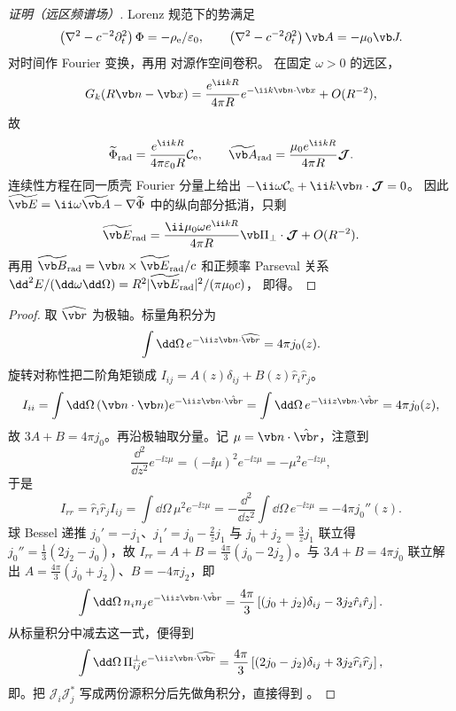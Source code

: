 \begin{proof}[证明（远区频谱场）]
Lorenz 规范下的势满足
\[
 \left(\nabla^2-c^{-2}\partial_t^2\right)\Phi=-\rho_{\rm e}/\varepsilon_0,
 \qquad
 \left(\nabla^2-c^{-2}\partial_t^2\right)\vb A=-\mu_0\vb J .
\]
对时间作 Fourier 变换，再用 对源作空间卷积。
在固定 \(\omega>0\) 的远区，
\[
 G_k(R\vb n-\vb x)
 =\frac{e^{\ii kR}}{4\pi R}e^{-\ii k\vb n\cdot\vb x}
 +O(R^{-2}),
\]
故
\[
 \widetilde\Phi_{\rm rad}
 =\frac{e^{\ii kR}}{4\pi\varepsilon_0R}\mathcal C_{\rm e},
 \qquad
 \widetilde{\vb A}_{\rm rad}
 =\frac{\mu_0e^{\ii kR}}{4\pi R}\boldsymbol{\mathcal J}.
\]
连续性方程在同一质壳 Fourier 分量上给出
\(-\ii\omega\mathcal C_{\rm e}+\ii k\vb n\cdot\boldsymbol{\mathcal J}=0\)。
因此 \(\widetilde{\vb E}=\ii\omega\widetilde{\vb A}-\nabla\widetilde\Phi\)
中的纵向部分抵消，只剩
\[
 \widetilde{\vb E}_{\rm rad}
 =\frac{\ii\mu_0\omega e^{\ii kR}}{4\pi R}
 \vb\Pi_\perp\cdot\boldsymbol{\mathcal J}+O(R^{-2}).
\]
再用 \(\widetilde{\vb B}_{\rm rad}=\vb n\times\widetilde{\vb E}_{\rm rad}/c\)
和正频率 Parseval 关系
\( \dd^2E/(\dd\omega\dd\Omega)=R^2|\widetilde{\vb E}_{\rm rad}|^2/(\pi\mu_0c)\)，
即得。
\end{proof}

\begin{proof}
取 \(\widehat{\vb r}\) 为极轴。标量角积分为
\[
 \int\dd\Omega\,e^{-\ii z\vb n\cdot\widehat{\vb r}}=4\pi j_0(z).
\]
旋转对称性把二阶角矩锁成 \(I_{ij}=A(z)\delta_{ij}+B(z)\hat r_i\hat r_j\)。
\[
 I_{ii}=\int\dd\Omega\,(\vb n\cdot\vb n)e^{-\ii z\vb n\cdot\hat{\vb r}}=\int\dd\Omega\,e^{-\ii z\vb n\cdot\hat{\vb r}}=4\pi j_0(z),
\]
故 \(3A+B=4\pi j_0\)。再沿极轴取分量。记 \(\mu=\vb n\cdot\hat{\vb r}\)，注意到
\[
 \frac{\dd^2}{\dd z^2}e^{-\ii z\mu}=(-\ii\mu)^2e^{-\ii z\mu}=-\mu^2 e^{-\ii z\mu},
\]
于是
\[
 I_{rr}=\hat r_i\hat r_j I_{ij}=\int\dd\Omega\,\mu^2 e^{-\ii z\mu}
 =-\frac{\dd^2}{\dd z^2}\int\dd\Omega\,e^{-\ii z\mu}=-4\pi j_0''(z).
\]
球 Bessel 递推 \(j_0'=-j_1\)、\(j_1'=j_0-\frac{2}{z}j_1\) 与 \(j_0+j_2=\frac{3}{z}j_1\) 联立得 \(j_0''=\frac13(2j_2-j_0)\)，故 \(I_{rr}=A+B=\frac{4\pi}{3}(j_0-2j_2)\)。与 \(3A+B=4\pi j_0\) 联立解出 \(A=\frac{4\pi}{3}(j_0+j_2)\)、\(B=-4\pi j_2\)，即
\[
 \int\dd\Omega\,n_in_j e^{-\ii z\vb n\cdot\hat{\vb r}}
 =\frac{4\pi}{3}\left[(j_0+j_2)\delta_{ij}
 -3j_2\hat r_i\hat r_j\right].
\]
从标量积分中减去这一式，便得到
\[
 \int\dd\Omega\,\Pi^\perp_{ij}e^{-\ii z\vb n\cdot\widehat{\vb r}}
 =\frac{4\pi}{3}\left[(2j_0-j_2)\delta_{ij}
 +3j_2\widehat r_i\widehat r_j\right],
\]
即。把
\(\mathcal J_i\mathcal J_j^*\) 写成两份源积分后先做角积分，直接得到
。
\end{proof}

